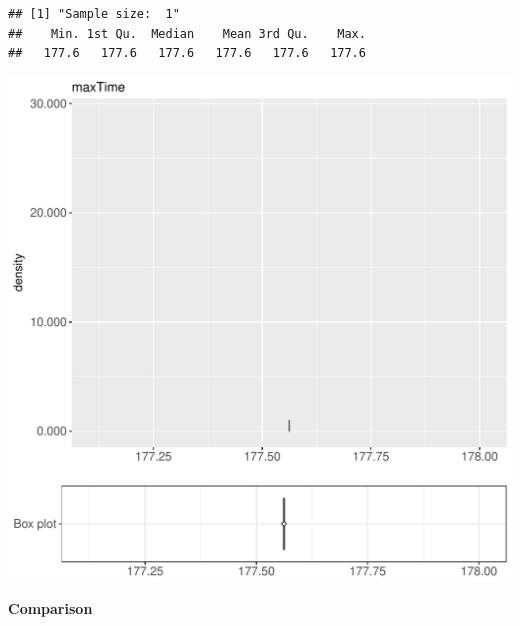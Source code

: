 \documentclass{article}\usepackage[]{graphicx}\usepackage[]{color}
\makeatletter
\def\maxwidth{ %
  \ifdim\Gin@nat@width>\linewidth
    \linewidth
  \else
    \Gin@nat@width
  \fi
}
\newenvironment{kframe}{%
 \def\at@end@of@kframe{}%
 \ifinner\ifhmode%
  \def\at@end@of@kframe{\end{minipage}}%
  \begin{minipage}{\columnwidth}%
 \fi\fi%
 \def\FrameCommand##1{\hskip\@totalleftmargin \hskip-\fboxsep
 \colorbox{shadecolor}{##1}\hskip-\fboxsep
     \hskip-\linewidth \hskip-\@totalleftmargin \hskip\columnwidth}%
 \MakeFramed {\advance\hsize-\width
   \@totalleftmargin\z@ \linewidth\hsize
   \@setminipage}}%
 {\par\unskip\endMakeFramed%
 \at@end@of@kframe}
\newenvironment{knitrout}{}{} %
\makeatother
\begin{document}
\begin{knitrout}
\color{fgcolor}\begin{kframe}
\begin{verbatim}
## [1] "Sample size:  1"
##    Min. 1st Qu.  Median    Mean 3rd Qu.    Max. 
##   177.6   177.6   177.6   177.6   177.6   177.6
\end{verbatim}


{\ttfamily\noindent\bfseries{}}\end{kframe}
\includegraphics[width=\maxwidth]{figure/RH2_noCache_big-1} 

\end{knitrout}
  
 \textbf{Comparison}
  
\end{document}
